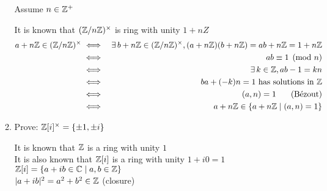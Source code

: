 \documentclass[letterpaper,12pt,fleqn]{article}
\begin{document}
\begin{enumerate}
\begin{enumerate}
      Assume $n\in\mathbb{Z}^+$

      It is known that $(\mathbb{Z}/n\mathbb{Z})^{\times}$ is ring with unity $1+nZ$
      \begin{eqnarray*}
        a+n\mathbb{Z}\in(\mathbb{Z}/n\mathbb{Z})^{\times} &\iff& \exists\,b+n\mathbb{Z}\in(\mathbb{Z}/n\mathbb{Z})^{\times},(a+n\mathbb{Z})(b+n\mathbb{Z})=ab+n\mathbb{Z}=1+n\mathbb{Z} \\
        &\iff& ab\equiv1\pmod{n} \\
        &\iff& \exists\,k\in\mathbb{Z},ab-1=kn \\
        &\iff& ba+(-k)n=1\ \mbox{has solutions in}\ \mathbb{Z} \\
        &\iff& (a,n)=1\hspace{0.25in}\mbox{(B\'{e}zout)} \\
        &\iff& a+n\mathbb{Z}\in\{a+n\mathbb{Z}\mid(a,n)=1\}
      \end{eqnarray*}

      \newcommand{\EZ}{\Z[i]}
      \newcommand{\EZx}{\EZ^{\times}}
      \newcommand{\U}{\{\pm1,\pm i\}}

    \item Prove: $\EZx=\U$

      It is known that $\mathbb{Z}$ is a ring with unity $1$ \\
      It is also known that $\EZ$ is a ring with unity $1+i0=1$ \\
      $\EZ=\{a+ib\in\C\mid a,b\in\Z\}$ \\
      $\lvert a+ib\rvert^2=a^2+b^2\in\mathbb{Z}$ (closure)

\end{enumerate}
\end{enumerate}
\end{document}
